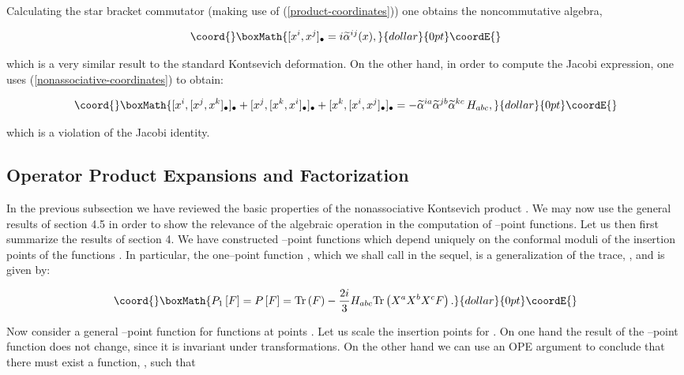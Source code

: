 \documentclass[a4paper,11pt]{article}
\providecommand{\mathbb}[1]{{\bf{#1}}}
\begin{document}
\noindent 
Calculating the star bracket commutator (making use of
(\ref{product-coordinates})) one obtains the noncommutative algebra,

$$\coord{}\boxMath{
[x^{i}, x^{j}]_{\bullet} = i \widetilde{\alpha}^{ij}(x),
}{dollar}{0pt}\coordE{}$$

\noindent 
which is a very similar result to the standard Kontsevich deformation. On
the other hand, in order to compute the Jacobi expression, one uses
(\ref{nonassociative-coordinates}) to obtain:

$$\coord{}\boxMath{
[x^{i}, [x^{j}, x^{k}]_{\bullet}]_{\bullet} + [x^{j}, [x^{k},
x^{i}]_{\bullet}]_{\bullet} + [x^{k}, [x^{i}, x^{j}]_{\bullet}]_{\bullet} =
- \widetilde{\alpha}^{ia} \widetilde{\alpha}^{jb} \widetilde{\alpha}^{kc}\, H_{abc},
}{dollar}{0pt}\coordE{}$$

\noindent 
which is a violation of the Jacobi identity.


\subsection{Operator Product Expansions and Factorization}


In the previous subsection we have reviewed the basic properties of the
nonassociative Kontsevich product \myHighlight{$\bullet$}\coordHE{}. We may now use the general
results of section 4.5 in order to show the relevance of the algebraic
operation \myHighlight{$\bullet$}\coordHE{} in the computation of \coordHE{}--point functions. Let us then
first summarize the results of section 4. We have constructed \coordHE{}--point
functions \coordHE{} which depend uniquely
on the \coordHE{} conformal moduli of the insertion points \coordHE{} of the
functions \coordHE{}. In particular, the one--point function \coordHE{}, which we
shall call \coordHE{} in the sequel, is a generalization of the trace,
\coordHE{}, and is given by:

$$\coord{}\boxMath{
P_{1}\left[ F\right] =P\left[ F\right] =\mathrm{Tr}\left( F\right) - 
\frac{2i}{3}H_{abc}\mathrm{Tr}\left( X^{a}X^{b}X^{c}F\right) .
}{dollar}{0pt}\coordE{}$$

\noindent
Now consider a general \coordHE{}--point function for functions \coordHE{} at points
\coordHE{}. Let us scale the insertion points \coordHE{} for \coordHE{}. On one hand the
result of the \coordHE{}--point function does not change, since it is invariant
under \myHighlight{$SL\left( 2,\mathbb{R}\right)$}\coordHE{} transformations. On the other hand we
can use an OPE argument to conclude that there must exist a function,
\coordHE{}, such
that
\end{document}
